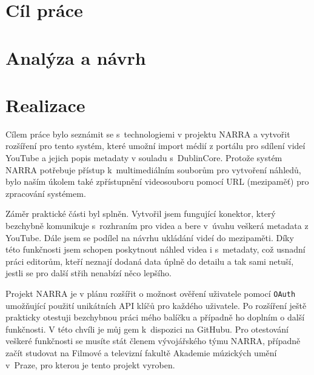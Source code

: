 \documentclass[thesis=B,czech]{FITthesis}[2012/06/26]
\begin{document}
\chapter{Cíl práce}
	
\chapter{Analýza a návrh}
	
	
	
	
	
	
	
\chapter{Realizace}
	
	
\begin{conclusion}
	\par Cílem práce bylo seznámit se s~technologiemi v projektu NARRA a vytvořit rozšíření pro tento systém, které umožní import médií z portálu pro sdílení videí YouTube a jejich popis metadaty v souladu s~DublinCore. Protože systém NARRA potřebuje přístup k~multimediálním souborům pro vytvoření náhledů, bylo naším úkolem také zpřístupnění videosouboru pomocí URL (mezipaměť) pro zpracování systémem. 
	\par Záměr praktické části byl splněn. Vytvořil jsem fungující konektor, který bezchybně komunikuje s~rozhraním pro videa a bere v~úvahu veškerá metadata z YouTube. Dále jsem se podílel na návrhu ukládání videí do mezipaměti. Díky této funkčnosti jsem schopen poskytnout náhled videa i s~metadaty, což usnadní práci editorům, kteří neznají dodaná data úplně do detailu a tak sami netuší, jestli se pro další střih nenabízí něco lepšího.
	\par Projekt NARRA je v plánu rozšířit o možnost ověření uživatele pomocí \texttt{OAuth} umožňující použití unikátních API klíčů pro každého uživatele. Po rozšíření ještě prakticky otestuji bezchybnou práci mého balíčku a případně ho doplním o další funkčnosti. V této chvíli je můj gem k~dispozici na GitHubu\cite{myself}. Pro otestování veškeré funkčnosti se musíte stát členem vývojářského týmu NARRA, případně začít studovat na Filmové a televizní fakultě Akademie múzických umění v~Praze, pro kterou je tento projekt vyroben.
\end{conclusion}



\end{document}
